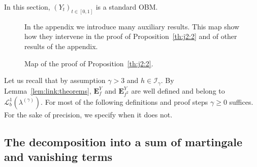 \documentclass[12pt]{article}
\numberwithin{equation}{section}
\theoremstyle{definition}
\theoremstyle{remark}
\newcommand{\Lgb}[1]{\mathcal{L}^{1}_{b}(\lambda^{(#1)})}
\newcommand{\Lg}[1]{\mathcal{I}_{#1}}
\newcommand{\bfH}[1]{\mathbf{E}^Y_{#1}}
\begin{document}
In this section, $(Y_t)_{t\in [0,1]}$ is a standard OBM.


\begin{figure}[t]
\begin{figure}[omitted: a diagram of this paper's results, not reproduced here]\end{figure}
\captionsetup{singlelinecheck=off}
\caption[Proof Prop map]{Map of the proof of Proposition~\ref{th:j2:2}.}\label{ProofMapProp}
In the appendix we introduce many auxiliary results. This map show how they intervene in the proof of Proposition~\ref{th:j2:2} and of other results of the appendix. %
\end{figure}





Let us recall that by assumption $\gamma >3$ and $h\in \Lg{\gamma}$. 
By Lemma~\ref{lem:link:theorems}, $\bfH{f}$ and $\bfH{f^2}$ are well defined and belong to $\Lgb{\gamma}$.
For most of the following definitions and proof steps $\gamma\geq 0$ suffices. For the sake of precision, we specify when it does not.
%



\subsection{The decomposition into a sum of martingale and vanishing terms} \label{sec:decomposition}
\end{document}
